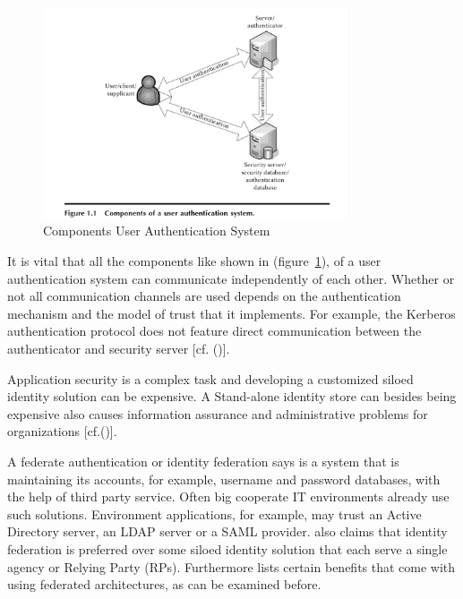\begin{figure}[h]
	\centering
	\includegraphics[width=0.8\textwidth]{images/componentsUserAuthenticationSystem}
	\caption[Componets Authentication]{Components User Authentication System}
	\label{fig:componentsuserauthenticationsystem}
\end{figure}


It is vital that all the components like shown in (figure~\ref{fig:componentsuserauthenticationsystem}), of a user authentication system can communicate independently of each other. Whether or not all communication channels are used depends on the authentication mechanism and the model of trust that it implements. For example, the Kerberos authentication protocol does not feature direct communication between the authenticator and security server [cf. (\cite{Todorov:2007:MUI})]. 

Application security is a complex task and developing a customized siloed identity solution can be expensive. A Stand-alone identity store can besides being expensive also causes information assurance and administrative problems for organizations  [cf.(\cite{JerichoSystems:IS})]. 

  A federate authentication or identity federation says \cite{Boyed:2012:GSOA} is a system that is maintaining its accounts, for example, username and password databases, with the help of third party service. Often big cooperate IT environments already use such solutions. Environment applications, for example, may trust an Active Directory server, an LDAP server or a SAML provider.    \cite{NIST:2017:DIG} also claims that identity federation is preferred over some siloed identity solution that each serve a single agency or Relying Party (RPs). Furthermore \cite{NIST:2017:DIG} lists certain benefits that come with using federated architectures, as can be examined before. 

